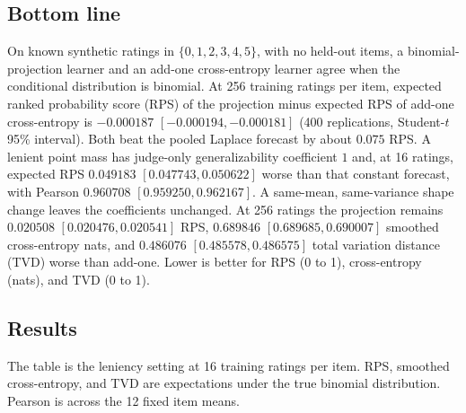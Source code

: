 
\subsection*{Bottom line}

On known synthetic ratings in $\{0,1,2,3,4,5\}$, with no held-out items, a binomial-projection learner and an add-one cross-entropy learner agree when the conditional distribution is binomial. At 256 training ratings per item, expected ranked probability score (RPS) of the projection minus expected RPS of add-one cross-entropy is $-0.000187$ $[-0.000194,-0.000181]$ (400 replications, Student-$t$ 95\% interval). Both beat the pooled Laplace forecast by about $0.075$ RPS. A lenient point mass has judge-only generalizability coefficient $1$ and, at 16 ratings, expected RPS $0.049183$ $[0.047743,0.050622]$ worse than that constant forecast, with Pearson $0.960708$ $[0.959250,0.962167]$. A same-mean, same-variance shape change leaves the coefficients unchanged. At 256 ratings the projection remains $0.020508$ $[0.020476,0.020541]$ RPS, $0.689846$ $[0.689685,0.690007]$ smoothed cross-entropy nats, and $0.486076$ $[0.485578,0.486575]$ total variation distance (TVD) worse than add-one. Lower is better for RPS (0 to 1), cross-entropy (nats), and TVD (0 to 1).

\subsection*{Results}

The table is the leniency setting at 16 training ratings per item. RPS, smoothed cross-entropy, and TVD are expectations under the true binomial distribution. Pearson is across the 12 fixed item means.


